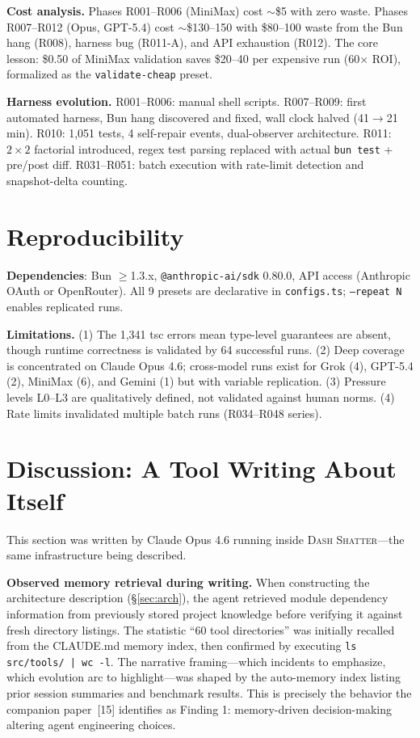 \documentclass[10pt,a4paper]{article}
\begin{document}
\textbf{Cost analysis.} Phases R001--R006 (MiniMax) cost $\sim$\$5 with zero waste. Phases R007--R012 (Opus, GPT-5.4) cost $\sim$\$130--150 with \$80--100 waste from the Bun hang (R008), harness bug (R011-A), and API exhaustion (R012). The core lesson: \$0.50 of MiniMax validation saves \$20--40 per expensive run (60$\times$ ROI), formalized as the \texttt{validate-cheap} preset.

\textbf{Harness evolution.} R001--R006: manual shell scripts. R007--R009: first automated harness, Bun hang discovered and fixed, wall clock halved (41$\to$21\,min). R010: 1{,}051 tests, 4 self-repair events, dual-observer architecture. R011: $2\times2$ factorial introduced, regex test parsing replaced with actual \texttt{bun test} + pre/post diff. R031--R051: batch execution with rate-limit detection and snapshot-delta counting.

\section{Reproducibility}\label{sec:repro}

\textbf{Dependencies}: Bun $\geq$1.3.x, \texttt{@anthropic-ai/sdk} 0.80.0, API access (Anthropic OAuth or OpenRouter). All 9 presets are declarative in \texttt{configs.ts}; \texttt{--repeat N} enables replicated runs.

\textbf{Limitations.} (1) The 1{,}341 tsc errors mean type-level guarantees are absent, though runtime correctness is validated by 64 successful runs. (2) Deep coverage is concentrated on Claude Opus 4.6; cross-model runs exist for Grok (4), GPT-5.4 (2), MiniMax (6), and Gemini (1) but with variable replication. (3) Pressure levels L0--L3 are qualitatively defined, not validated against human norms. (4) Rate limits invalidated multiple batch runs (R034--R048 series).

\section{Discussion: A Tool Writing About Itself}\label{sec:discussion}

This section was written by Claude Opus 4.6 running inside \textsc{Dash Shatter}---the same infrastructure being described.

\textbf{Observed memory retrieval during writing.}
When constructing the architecture description (\S\ref{sec:arch}), the agent retrieved module dependency information from previously stored project knowledge before verifying it against fresh directory listings. The statistic ``60 tool directories'' was initially recalled from the CLAUDE.md memory index, then confirmed by executing \texttt{ls src/tools/ | wc -l}. The narrative framing---which incidents to emphasize, which evolution arc to highlight---was shaped by the auto-memory index listing prior session summaries and benchmark results. This is precisely the behavior the companion paper~[15] identifies as Finding 1: memory-driven decision-making altering agent engineering choices.
\end{document}
